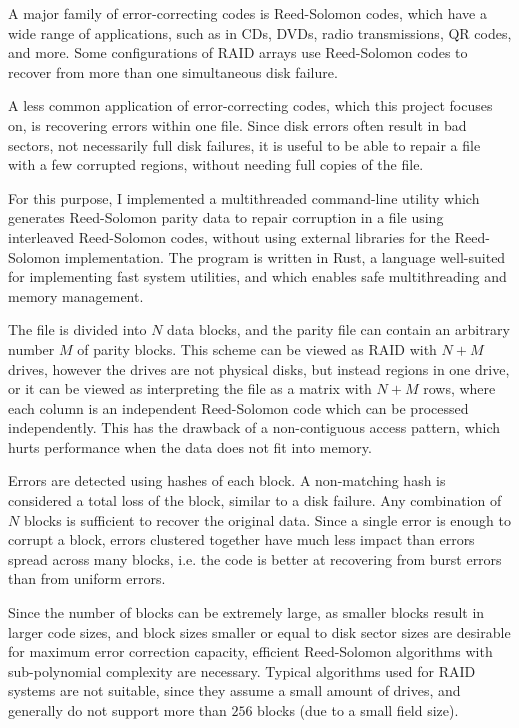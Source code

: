 A major family of error-correcting codes is Reed-Solomon codes, which have a wide range of applications, such as in CDs, DVDs, radio transmissions, QR codes, and more.
Some configurations of RAID arrays use Reed-Solomon codes to recover from more than one simultaneous disk failure.

A less common application of error-correcting codes, which this project focuses on, is recovering errors within one file.
Since disk errors often result in bad sectors, not necessarily full disk failures, it is useful to be able to repair a file with a few corrupted regions, without needing full copies of the file.

For this purpose, I implemented a multithreaded command-line utility which generates Reed-Solomon parity data to repair corruption in a file using interleaved Reed-Solomon codes, without using external libraries for the Reed-Solomon implementation.
The program is written in Rust, a language well-suited for implementing fast system utilities, and which enables safe multithreading and memory management.

The file is divided into $N$ data blocks, and the parity file can contain an arbitrary number $M$ of parity blocks.
This scheme can be viewed as RAID with $N + M$ drives, however the drives are not physical disks, but instead regions in one drive,
or it can be viewed as interpreting the file as a matrix with $N + M$ rows, where each column is an independent Reed-Solomon code which can be processed independently.
This has the drawback of a non-contiguous access pattern, which hurts performance when the data does not fit into memory.

Errors are detected using hashes of each block. A non-matching hash is considered a total loss of the block, similar to a disk failure. Any combination of $N$ blocks is sufficient to recover the original data.
Since a single error is enough to corrupt a block, errors clustered together have much less impact than errors spread across many blocks, i.e. the code is better at recovering from burst errors than from uniform errors.

Since the number of blocks can be extremely large, as smaller blocks result in larger code sizes, and block sizes smaller or equal to disk sector sizes are desirable for maximum error correction capacity,
efficient Reed-Solomon algorithms with sub-polynomial complexity are necessary.
Typical algorithms used for RAID systems are not suitable, since they assume a small amount of drives, and generally do not support more than $256$ blocks (due to a small field size).


